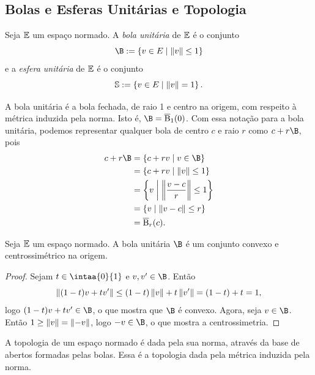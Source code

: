 \subsection{Bolas e Esferas Unitárias e Topologia}

\begin{defi}
Seja $\mathbb{E}$ um espaço normado. A \emph{bola unitária} de $\mathbb{E}$ é o conjunto
	\begin{equation*}
	\B := \set{v \in E}{\nor{v} \leq 1}
	\end{equation*}
e a \emph{esfera unitária} de $\mathbb{E}$ é o conjunto
	\begin{equation*}
	\mathbb{S} := \left\{v \in E \;\middle\vert\; \left\Vert{v}\right\Vert = 1 \right\}.
	\end{equation*}
\end{defi}

A bola unitária é a bola fechada, de raio 1 e centro na origem, com respeito à métrica induzida pela norma. Isto é, $\B = \overline\bola_1(0)$. Com essa notação para a bola unitária, podemos representar qualquer bola de centro $c$ e raio $r$ como $c+r\B$, pois
	\begin{align*}
	c+r\B &= \set{c+rv}{v \in \B} \\
		&= \set{c+rv}{\nor{v} \leq 1} \\
		&= \set{v}{\nor{\frac{v-c}{r}} \leq 1} \\
		&= \set{v}{\nor{v-c} \leq r} \\
		&= \overline\bola_r(c).
	\end{align*}

\begin{prop}
Seja $\mathbb{E}$ um espaço normado. A bola unitária $\B$ é um conjunto convexo e centrossimétrico na origem.
\end{prop}
\begin{proof}
Sejam $t \in \intaa{0}{1}$ e $v,v' \in \B$. Então
	\begin{equation*}
	\left\Vert{(1-t)v+tv'}\right\Vert \leq (1-t)\left\Vert{v}\right\Vert+t\left\Vert{v'}\right\Vert =(1-t)+t=1,
	\end{equation*}
logo $(1-t)v+tv' \in \B$, o que mostra que $\B$ é convexo. Agora, seja $v \in \B$. Então $1 \geq \left\Vert{v}\right\Vert = \left\Vert{-v}\right\Vert$, logo $-v \in \B$, o que mostra a centrossimetria.
\end{proof}

A topologia de um espaço normado é dada pela sua norma, através da base de abertos formadas pelas bolas. Essa é a topologia dada pela métrica induzida pela norma.

